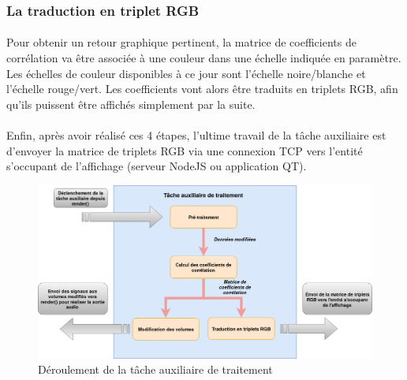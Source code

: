 \subsubsection{La traduction en triplet RGB}
\paragraph{}
Pour obtenir un retour graphique pertinent, la matrice de coefficients de corrélation va être associée à une couleur dans une échelle indiquée en paramètre. Les échelles de couleur disponibles à ce jour sont l'échelle noire/blanche et l'échelle rouge/vert. Les coefficients vont alors être traduits en triplets RGB, afin qu'ils puissent être affichés simplement par la suite.
\paragraph{}
Enfin, après avoir réalisé ces 4 étapes, l'ultime travail de la tâche auxiliaire est d'envoyer la matrice de triplets RGB via une connexion TCP vers l'entité s'occupant de l'affichage (serveur NodeJS ou application QT).
\begin{figure}[H]
    \centering
    \includegraphics[scale=0.45]{assets/auxtask.png}
    \caption{Déroulement de la tâche auxiliaire de traitement}
    \label{aux task}
\end{figure}

